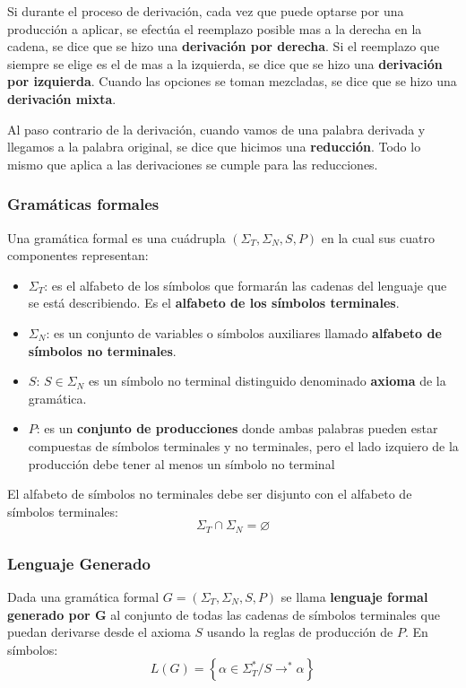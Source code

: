 \documentclass[12pt]{article}
\begin{document}
Si durante el proceso de derivación, cada vez que puede optarse por una producción a aplicar, se efectúa el reemplazo posible mas a la derecha en la cadena, se dice que se hizo una \textbf{derivación por derecha}. Si el reemplazo que siempre se elige es el de mas a la izquierda, se dice que se hizo una \textbf{derivación por izquierda}. Cuando las opciones se toman mezcladas, se dice que se hizo una \textbf{derivación mixta}.

Al paso contrario de la derivación, cuando vamos de una palabra derivada y llegamos a la palabra original, se dice que hicimos una \textbf{reducción}. Todo lo mismo que aplica a las derivaciones se cumple para las reducciones.

\subsubsection{Gramáticas formales}
Una gramática formal es una cuádrupla $ \left(\Sigma_{T}, \Sigma_{N}, S, P\right) $ en la cual sus cuatro componentes representan:
\begin{itemize}
  \item $ \Sigma_{T} $: es el alfabeto de los símbolos que formarán las cadenas del lenguaje que se está describiendo. Es el \textbf{alfabeto de los símbolos terminales}.

  \item $ \Sigma_{N} $: es un conjunto de variables o símbolos auxiliares llamado \textbf{alfabeto de símbolos no terminales}.

  \item $ S $: $ S\in \Sigma_{N} $ es un símbolo no terminal distinguido denominado \textbf{axioma} de la gramática.

  \item $ P $: es un \textbf{conjunto de producciones} donde ambas palabras pueden estar compuestas de símbolos terminales y no terminales, pero el lado izquiero de la producción debe tener al menos un símbolo no terminal
\end{itemize}

El alfabeto de símbolos no terminales debe ser disjunto con el alfabeto de símbolos terminales:
\[
\Sigma_{T}\cap \Sigma_{N} = \varnothing 
\]

\subsubsection{Lenguaje Generado}
Dada una gramática formal $ G = \left(\Sigma_{T}, \Sigma_{N}, S, P\right) $ se llama \textbf{lenguaje formal generado por G} al conjunto de todas las cadenas de símbolos terminales que puedan derivarse desde el axioma $ S $ usando la reglas de producción de $ P $. En símbolos:
\[
L(G) = \left\{\alpha\in \Sigma_{T}^{*}/ S\to^{*}\alpha\right\}
\]
\end{document}
